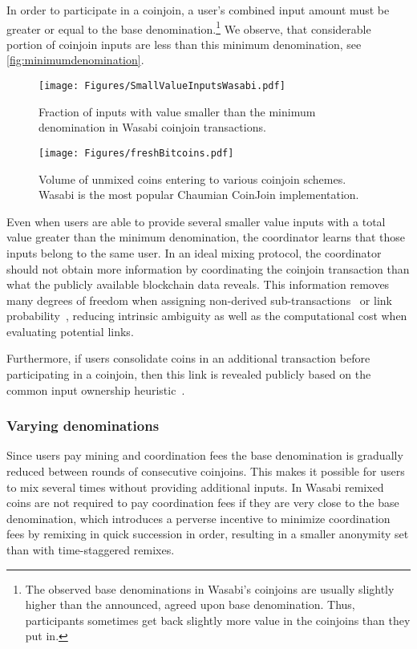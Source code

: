 \documentclass[a4paper]{article}
\begin{document}
In order to participate in a coinjoin, a user's combined input amount must be greater or equal to the base denomination.\footnote{The observed base denominations in Wasabi's coinjoins are usually slightly higher than the announced, agreed upon base denomination. Thus, participants sometimes get back slightly more value in the coinjoins than they put in.} We observe, that considerable portion of coinjoin inputs are less than this minimum denomination, see \cref{fig:minimumdenomination}.

\begin{figure}%
\centering
\begin{minipage}{.45\textwidth}
    \centering
    \texttt{[image: Figures/SmallValueInputsWasabi.pdf]}
    \caption{Fraction of inputs with value smaller than the minimum denomination in Wasabi coinjoin transactions.}
    \label{fig:minimumdenomination}
\end{minipage}
\hspace{6pt}
\begin{minipage}{.45\textwidth}
    \centering
    \texttt{[image: Figures/freshBitcoins.pdf]}
    \caption{Volume of unmixed coins entering to various coinjoin schemes. Wasabi is the most popular Chaumian CoinJoin implementation.}
    \label{fig:freshBitcoins}
\end{minipage}
\end{figure}

Even when users are able to provide several smaller value inputs with a total value greater than the minimum denomination, the coordinator learns that those inputs belong to the same user. In an ideal mixing protocol, the coordinator should not obtain more information by coordinating the coinjoin transaction than what the publicly available blockchain data reveals. This information removes many degrees of freedom when assigning non-derived sub-transactions~\cite{maurer2017anonymous} or link probability~\cite{laurentmt2015bitcoin}, reducing intrinsic ambiguity as well as the computational cost when evaluating potential links.

Furthermore, if users consolidate coins in an additional transaction before participating in a coinjoin, then this link is revealed publicly based on the common input ownership heuristic~\cite{meiklejohn2013fistful}.

\subsubsection{Varying denominations} Since users pay mining and coordination fees the base denomination is gradually reduced between rounds of consecutive coinjoins. This makes it possible for users to mix several times without providing additional inputs. In Wasabi remixed coins are not required to pay coordination fees if they are very close to the base denomination, which introduces a perverse incentive to minimize coordination fees by remixing in quick succession in order, resulting in a smaller anonymity set than with time-staggered remixes.
\end{document}
